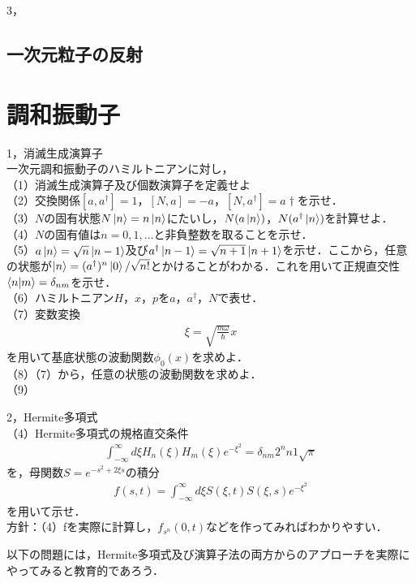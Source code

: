 \documentclass[a4j]{jarticle}
\begin{document}
3，

\subsection{一次元粒子の反射}


\section{調和振動子}

1，消滅生成演算子\\
一次元調和振動子のハミルトニアンに対し，\\
（1）消滅生成演算子及び個数演算子を定義せよ\\
（2）交換関係$[a,a^\dagger]=1$，$[N,a]=-a$，$[N,a^\dagger]=a\dagger$を示せ．\\
（3）$N$の固有状態$N\ket{n}=n\ket{n}$にたいし，$N(a\ket{n})$，$N(a^\dagger\ket{n})$を計算せよ．\\
（4）$N$の固有値は$n=0,1,\dots $と非負整数を取ることを示せ．\\
（5）$a\ket{n}=\sqrt{n}\ket{n-1}$及び$a^\dagger\ket{n-1}=\sqrt{n+1}\ket{n+1}$を示せ．ここから，任意の状態が$\ket{n}=(a^\dagger)^n\ket{0}/\sqrt{n!}$とかけることがわかる．これを用いて正規直交性$\braket{n|m}=\delta_{nm}$を示せ．\\
（6）ハミルトニアン$H$，$x$，$p$を$a$，$a^\dagger$，$N$で表せ．\\
（7）変数変換
\begin{align*}
 \xi =\sqrt{\frac{m\omega}{\hbar}}x
\end{align*}
を用いて基底状態の波動関数$\phi_0(x)$を求めよ．\\
（8）（7）から，任意の状態の波動関数を求めよ．\\
（9）

2，Hermite多項式\\

（4）Hermite多項式の規格直交条件
\begin{align*}
 \int_{-\infty}^{\infty}d\xi H_n(\xi)H_m(\xi)e^{-\xi^2}=\delta_{nm}2^nn1\sqrt{\pi}
\end{align*}
を，母関数$S=e^{-s^2+2\xi s}$の積分
\begin{align*}
 f(s,t)=\int_{-\infty}^{\infty}d\xi S(\xi,t)S(\xi,s)e^{-\xi^2}
\end{align*}
を用いて示せ．\\

方針：（4）fを実際に計算し，$f_{s^n}(0,t)$などを作ってみればわかりやすい．


以下の問題には，Hermite多項式及び演算子法の両方からのアプローチを実際にやってみると教育的であろう．
\end{document}
